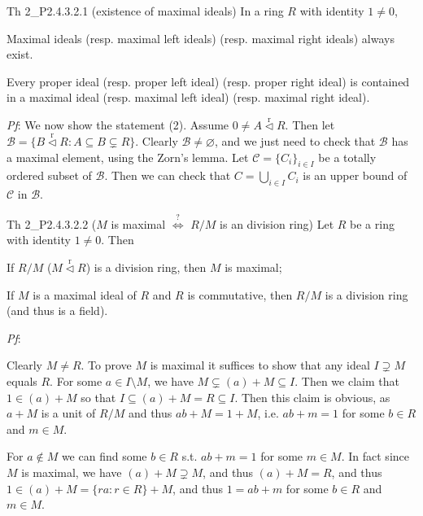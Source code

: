 \documentclass{article}
\newcommand{\nles}{\vartriangleleft}
\newcommand{\ideal}{\overset{\text{r}}{\nles}} %
\begin{document}
\begin{Th}{Th 2\_P2.4.3.2.1 (existence of maximal ideals)}
    In a ring $R$ with identity $1\neq 0$,
    \begin{compactenum}
        \item[(1)] Maximal ideals (resp. maximal left ideals) (resp. maximal right ideals) always exist.
        \item[(2)] Every proper ideal (resp. proper left ideal) (resp. proper right ideal) is contained in a maximal ideal (resp. maximal left ideal) (resp. maximal right ideal).
    \end{compactenum}
    \tcblower
    \textit{Pf}: We now show the statement (2). Assume $0\neq A\ideal R$. Then let $\mathcal{B} = \{B\ideal R: A\subseteq B\subsetneq R\}$. Clearly $\mathcal{B}\neq\varnothing$, and we just need to check that $\mathcal{B}$ has a maximal element, using the Zorn's lemma. Let $\mathcal{C} = \{C_i\}_{i\in I}$ be a totally ordered subset of $\mathcal{B}$. Then we can check that $C = \bigcup_{i\in I} C_i$ is an upper bound of $\mathcal{C}$ in $\mathcal{B}$. 
\end{Th}

\begin{Th}{Th 2\_P2.4.3.2.2 ($M$ is maximal $\overset{?}{\Longleftrightarrow}$ $R/M$ is an division ring)}
    Let $R$ be a ring with identity $1\neq 0$. Then
    \begin{compactenum}
        \item If $R/M$ ($M\ideal R$) is a division ring, then $M$ is maximal;
        \item If $M$ is a maximal ideal of $R$ and $R$ is commutative, then $R/M$ is a division ring (and thus is a field).
    \end{compactenum}
    \tcblower
    \textit{Pf}: 
    \begin{compactenum}
        \item Clearly $M\neq R$. To prove $M$ is maximal it suffices to show that any ideal $I\supsetneq M$ equals $R$. For some $a\in I\setminus M$, we have $M\subsetneq (a)+M\subseteq I$. Then we claim that $1\in (a)+M$ so that $I\subseteq (a)+M = R\subseteq I$. Then this claim is obvious, as $a+M$ is a unit of $R/M$ and thus $ab+M = 1+M$, i.e. $ab+m = 1$ for some $b\in R$ and $m\in M$. 
        \item For $a\notin M$ we can find some $b\in R$ s.t. $ab+m = 1$ for some $m\in M$. In fact since $M$ is maximal, we have $(a)+M\supsetneq M$, and thus $(a)+M=R$, and thus $1\in (a)+M = \{ra: r\in R\}+M$, and thus $1 = ab+m$ for some $b\in R$ and $m\in M$. 
    \end{compactenum}
\end{Th}
\end{document}
